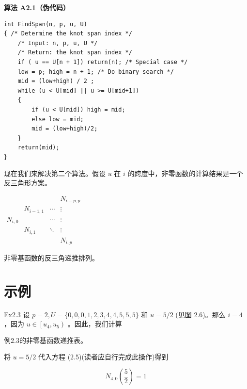 \documentclass[../main.tex]{subfiles}
\begin{document}
\par\medskip\noindent\textbf{算法 A2.1（伪代码）}\par
\begin{verbatim}
int FindSpan(n, p, u, U)
{ /* Determine the knot span index */
    /* Input: n, p, u, U */
    /* Return: the knot span index */
    if ( u == U[n + 1]) return(n); /* Special case */
    low = p; high = n + 1; /* Do binary search */
    mid = (low+high) / 2 ;
    while (u < U[mid] || u >= U[mid+1])
    {
        if (u < U[mid]) high = mid;
        else low = mid;
        mid = (low+high)/2;
    }
    return(mid);
}
\end{verbatim}

现在我们来解决第二个算法。假设 \(u\) 在 \(i\) 的跨度中，非零函数的计算结果是一个反三角形方案。

\begin{center}
\small
\(\begin{array}{cccc}
 & & & N_{i-p,p} \\
 & N_{i-1,1} & \cdots & \vdots \\
N_{i,0} & & \cdots & \vdots \\
 & N_{i,1} & \ddots & \vdots \\
 & & & N_{i,p}
\end{array}\)
\par\smallskip
非零基函数的反三角递推排列。
\end{center}

\section*{示例}

Ex2.3 设 \(p = 2,U = \{ 0,0,0,1,2,3,4,4,5,5,5\}\) 和 \(u = 5/2\) (见图 2.6)。那么 \(i = 4\) ，因为 \(u \in  \left\lbrack  {{u}_{4},{u}_{5}}\right)\) 。因此，我们计算

\begin{center}
\begin{minipage}{10cm}
\vspace*{.6\baselineskip}
\centering
{}
\par\smallskip
例2.3的非零基函数递推表。
\end{minipage}
\end{center} 

将 \(u = 5/2\) 代入方程 (2.5)(读者应自行完成此操作)得到

\[
{N}_{4,0}\left( \frac{5}{2}\right)  = 1
\]
\end{document}
